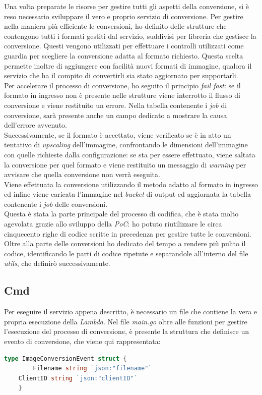 Una volta preparate le risorse per gestire tutti gli aspetti della conversione,
si è reso necessario sviluppare il vero e proprio servizio di conversione.
Per gestire nella maniera più efficiente le conversioni, ho definito delle strutture che contengono tutti i formati gestiti dal
servizio, suddivisi per libreria che gestisce la conversione. Questi vengono
utilizzati per effettuare i controlli utilizzati come guardia per scegliere la
conversione adatta al formato richiesto. Questa scelta permette inoltre di
aggiungere con facilità nuovi formati di immagine, qualora il servizio che ha il
compito di convertirli sia stato aggiornato per supportarli. \\
Per accelerare il processo di
conversione, ho seguito il principio \emph{fail fast}: se il formato in ingresso
non è presente nelle strutture viene interrotto il flusso di conversione e viene restituito un
errore. Nella tabella contenente i \emph{job} di conversione, sarà presente
anche un campo dedicato a mostrare la causa dell'errore avvenuto.\\
Successivamente, se il formato è accettato, viene verificato se è in atto un tentativo di
\emph{upscaling} dell'immagine, confrontando le dimensioni dell'immagine con
quelle richieste dalla configurazione: se sta per essere effettuato, viene
saltata la conversione per quel formato e viene restituito un messaggio di
\emph{warning} per avvisare che quella conversione non verrà eseguita.\\
Viene effettuata la conversione utilizzando il metodo adatto al formato in
ingresso ed infine viene caricata l'immagine nel \emph{bucket} di output ed
aggiornata la tabella contenente i \emph{job} delle conversioni.\\
Questa è stata la parte principale del processo di codifica, che è stata molto
agevolata grazie allo sviluppo della \emph{PoC}: ho potuto riutilizzare le circa
cinquecento righe di codice scritte in precedenza per gestire tutte le
conversioni. Oltre alla parte delle conversioni ho dedicato del tempo a rendere
più pulito il codice, identificando le parti di codice ripetute e separandole
all'interno del file \emph{utils}, che definirò successivamente.

\subsection{Cmd}

Per eseguire il servizio appena descritto, è necessario un file che contiene la
vera e propria esecuzione della \emph{Lambda}. Nel file \emph{main.go} oltre
alle funzioni per gestire l'esecuzione del processo di conversione, è presente
la struttura che definisce un evento di conversione, che viene qui
rappresentata:
\clearpage
\begin{lstlisting}[language=go]
    type ImageConversionEvent struct {
        Filename string `json:"filename"`
	ClientID string `json:"clientID"`
    }
\end{lstlisting}

